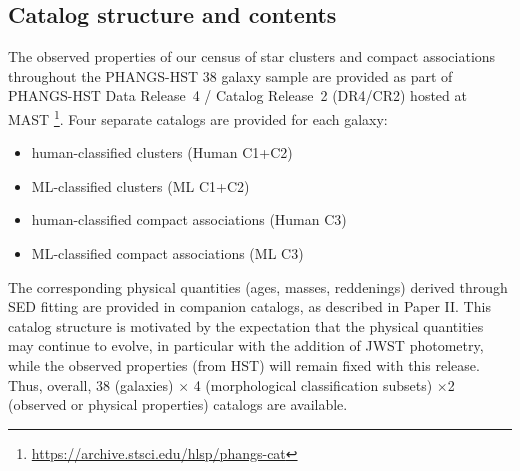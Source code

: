 \documentclass[linenumbers]{aastex63}
\begin{document}

\subsection{Catalog structure and contents}\label{ssect:cat_content}
The observed properties of our census of star clusters and compact associations throughout the PHANGS-HST 38 galaxy sample are provided as part of PHANGS-HST Data Release~4 / Catalog Release~2 (DR4/CR2) hosted at MAST
\footnote{\url{https://archive.stsci.edu/hlsp/phangs-cat}}.  Four separate catalogs are provided for each galaxy: 
\begin{itemize}
    \item human-classified clusters (Human C1+C2)
    \item ML-classified clusters (ML C1+C2)
    \item human-classified compact associations (Human C3)
    \item ML-classified compact associations (ML C3)
\end{itemize}
The corresponding physical quantities (ages, masses, reddenings) derived through SED fitting are provided in companion catalogs, as described in Paper II.  This catalog structure is motivated by the expectation that the physical quantities may continue to evolve, in particular with the addition of JWST photometry, while the observed properties (from HST) will remain fixed with this release. Thus, overall, 38 (galaxies) $\times$ 4 (morphological classification subsets) $ \times$2 (observed or physical properties) catalogs are available.
\end{document}
